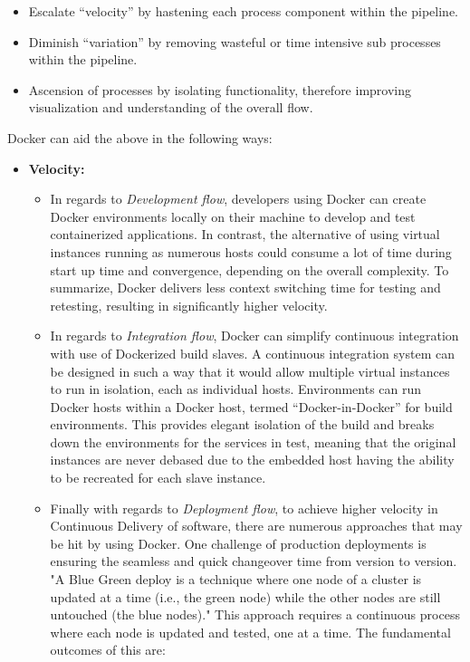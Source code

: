 \begin{itemize}
\item Escalate “velocity” by hastening each process component within the pipeline.
\item Diminish “variation” by removing wasteful or time intensive sub processes within the pipeline.
\item Ascension of processes by isolating functionality, therefore improving visualization and understanding of the overall flow.
\end{itemize}

Docker can aid the above in the following ways:
\begin{itemize}
\item \textbf{Velocity:}
	\begin{itemize}
	\item In regards to \emph{Development flow}, developers using Docker can create Docker environments locally on their machine to develop and test containerized applications. In contrast, the alternative of using virtual instances running as numerous hosts could consume a lot of time during start up time and convergence, depending on the overall complexity\cite{willis}. To summarize, Docker delivers less context switching time for testing and retesting, resulting in significantly higher velocity.
    \item In regards to \emph{Integration flow}, Docker can simplify continuous integration with use of Dockerized build slaves.  A continuous integration system can be designed in such a way that it would allow multiple virtual instances to run in isolation, each as individual hosts. Environments can run Docker hosts within a Docker host, termed “Docker-in-Docker” for build environments. This provides elegant isolation of the build and breaks down the environments for the services in test, meaning that the original instances are never debased due to the embedded host having the ability to be recreated for each slave instance\cite{willis}. 
    \item Finally with regards to \emph{Deployment flow}, to achieve higher velocity in  Continuous Delivery of software, there are numerous approaches that may be hit by using Docker. One challenge of production deployments is ensuring the seamless and quick changeover time from version to version. "A Blue Green deploy is a technique where one node of a cluster is updated at a time (i.e., the green node) while the other nodes are still untouched (the blue nodes)."\cite{willis} This approach requires a continuous process where each node is updated and tested, one at a time. The fundamental outcomes  of this are:

\end{itemize}
\end{itemize}
